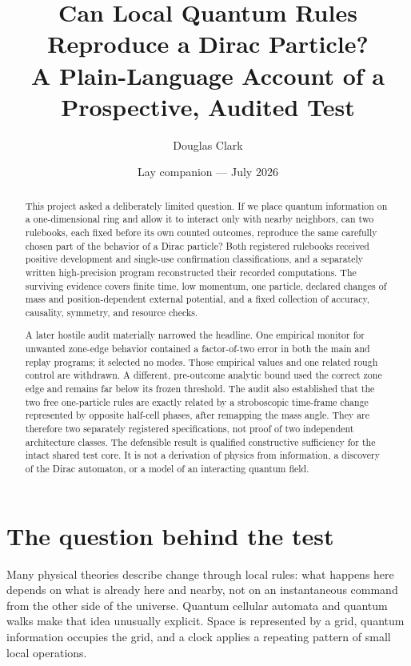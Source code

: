 \documentclass[11pt]{article}
\title{\textbf{Can Local Quantum Rules Reproduce a Dirac Particle?}\\[0.35em]
\large A Plain-Language Account of a Prospective, Audited Test}
\author{Douglas Clark}
\date{Lay companion --- July 2026}
\begin{document}
\maketitle

\begin{abstract}
This project asked a deliberately limited question.  If we place quantum
information on a one-dimensional ring and allow it to interact only with
nearby neighbors, can two rulebooks, each fixed before its own counted
outcomes, reproduce the same
carefully chosen part of the behavior of a Dirac particle?  Both registered
rulebooks received positive development and single-use confirmation
classifications, and a separately written high-precision program reconstructed
their recorded computations.  The surviving evidence covers finite time, low
momentum, one particle, declared changes of mass and position-dependent
external potential, and a
fixed collection of accuracy, causality, symmetry, and resource checks.

A later hostile audit materially narrowed the headline.  One empirical monitor
for unwanted zone-edge behavior contained a factor-of-two error in both the
main and replay programs; it selected no modes.  Those empirical values and one
related rough control are withdrawn.  A different, pre-outcome analytic bound
used the correct zone edge and remains far below its frozen threshold.  The
audit also established that the two free one-particle rules are exactly related
by a stroboscopic time-frame change represented by opposite half-cell phases,
after remapping the mass angle.  They are therefore two separately registered specifications, not proof
of two independent architecture classes.  The defensible result is qualified
constructive sufficiency for the intact shared test core.  It is not a
derivation of physics from information, a discovery of the Dirac automaton, or
a model of an interacting quantum field.
\end{abstract}

\section{The question behind the test}

Many physical theories describe change through local rules: what happens here
depends on what is already here and nearby, not on an instantaneous command
from the other side of the universe.  Quantum cellular automata and quantum
walks make that idea unusually explicit.  Space is represented by a grid,
quantum information occupies the grid, and a clock applies a repeating pattern
of small local operations.
\end{document}
